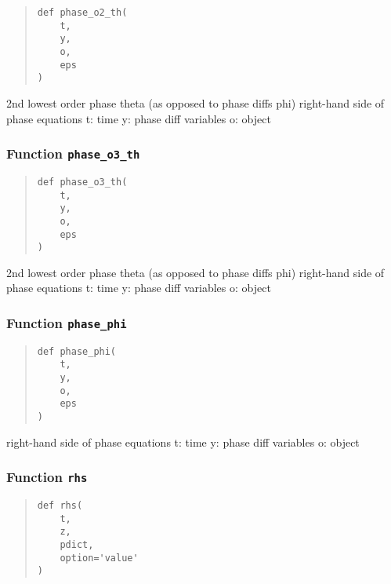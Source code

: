 \documentclass[english,a4paper,oneside]{article}
\begin{document}
\begin{quote}
\begin{verbatim}
def phase_o2_th(
    t,
    y,
    o,
    eps
)
\end{verbatim}
\end{quote}

2nd lowest order phase theta (as opposed to phase diffs phi) right-hand
side of phase equations t: time y: phase diff variables o: object

\hypertarget{CGL.phase_o3_th}{%
\subsubsection{\texorpdfstring{Function
\texttt{phase\_o3\_th}}{Function phase\_o3\_th}}\label{CGL.phase_o3_th}}

\begin{quote}
\begin{verbatim}
def phase_o3_th(
    t,
    y,
    o,
    eps
)
\end{verbatim}
\end{quote}

2nd lowest order phase theta (as opposed to phase diffs phi) right-hand
side of phase equations t: time y: phase diff variables o: object

\hypertarget{CGL.phase_phi}{%
\subsubsection{\texorpdfstring{Function
\texttt{phase\_phi}}{Function phase\_phi}}\label{CGL.phase_phi}}

\begin{quote}
\begin{verbatim}
def phase_phi(
    t,
    y,
    o,
    eps
)
\end{verbatim}
\end{quote}

right-hand side of phase equations t: time y: phase diff variables o:
object

\hypertarget{CGL.rhs}{%
\subsubsection{\texorpdfstring{Function
\texttt{rhs}}{Function rhs}}\label{CGL.rhs}}

\begin{quote}
\begin{verbatim}
def rhs(
    t,
    z,
    pdict,
    option='value'
)
\end{verbatim}
\end{quote}
\end{document}
